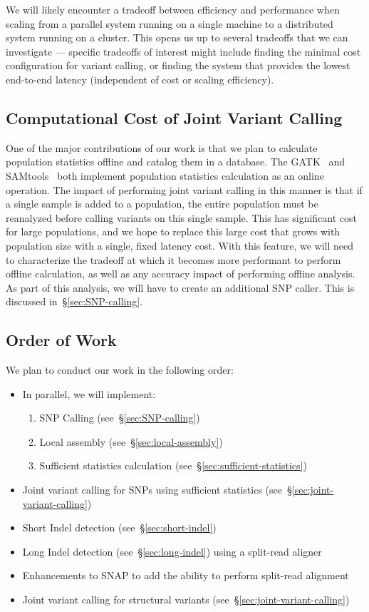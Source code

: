 \documentclass[11pt]{article}
\begin{document}
We will likely encounter a tradeoff between efficiency and performance when scaling from a parallel system running on a single
machine to a distributed system running on a cluster. This opens us up to several tradeoffs that we can investigate --- specific
tradeoffs of interest might include finding the minimal cost configuration for variant calling, or finding the system that provides
the lowest end-to-end latency (independent of cost or scaling efficiency).

\subsection{Computational Cost of Joint Variant Calling}
\label{sec:computational-cost-joint}

One of the major contributions of our work is that we plan to calculate population statistics offline and catalog them in a database.
The GATK~\cite {mckenna10} and SAMtools~\cite{li11} both implement population statistics calculation as an online operation. The
impact of performing joint variant calling in this manner is that if a single sample is added to a population, the entire population
must be reanalyzed before calling variants on this single sample. This has significant cost for large populations, and we hope to
replace this large cost that grows with population size with a single, fixed latency cost. With this feature, we will need to characterize
the tradeoff at which it becomes more performant to perform offline calculation, as well as any accuracy impact of performing offline
analysis. As part of this analysis, we will have to create an additional SNP caller. This is discussed in~\S\ref{sec:SNP-calling}.

\subsection{Order of Work}
\label{sec:order-of-work}

We plan to conduct our work in the following order:

\begin{itemize}
\item In parallel, we will implement:
\begin{enumerate}
\item SNP Calling (see~\S\ref{sec:SNP-calling})
\item Local assembly (see~\S\ref{sec:local-assembly})
\item Sufficient statistics calculation (see~\S\ref{sec:sufficient-statistics})
\end{enumerate}
\item Joint variant calling for SNPs using sufficient statistics (see~\S\ref{sec:joint-variant-calling})
\item Short Indel detection (see~\S\ref{sec:short-indel})
\item Long Indel detection (see~\S\ref{sec:long-indel}) using a split-read aligner
\item Enhancements to SNAP to add the ability to perform split-read alignment
\item Joint variant calling for structural variants (see~\S\ref{sec:joint-variant-calling})
\end{itemize}
\end{document}

